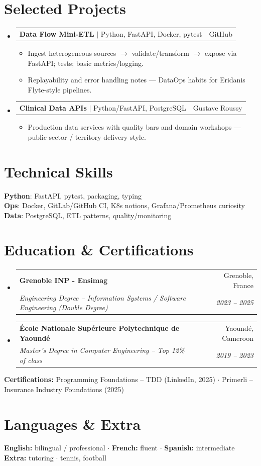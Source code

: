 \documentclass[letterpaper,10.5pt]{article}
\makeatletter
\newcommand{\resumeItem}[1]{\item\small{#1 \vspace{-1.5pt}}}
\newcommand{\resumeSubheading}[4]{\vspace{-1pt}\item\begin{tabular*}{0.97\textwidth}[t]{l@{\extracolsep{\fill}}r}\textbf{#1} & #2 \\\textit{\small#3} & \textit{\small #4} \\\end{tabular*}\vspace{-5pt}}
\newcommand{\resumeProjectHeading}[2]{\item\begin{tabular*}{0.97\textwidth}{l@{\extracolsep{\fill}}r}\small#1 & #2 \\\end{tabular*}\vspace{-5pt}}
\newcommand{\resumeSubHeadingListStart}{\begin{itemize}[leftmargin=0.15in, label={}]}
\newcommand{\resumeSubHeadingListEnd}{\end{itemize}}
\newcommand{\resumeItemListStart}{\begin{itemize}[leftmargin=0.18in]}
\newcommand{\resumeItemListEnd}{\end{itemize}\vspace{-3pt}}
\makeatother
\begin{document}
\section{Selected Projects}
\resumeSubHeadingListStart
  \resumeProjectHeading{\textbf{Data Flow Mini-ETL} $|$ Python, FastAPI, Docker, pytest}{GitHub}
    \resumeItemListStart
      \resumeItem{Ingest heterogeneous sources $\rightarrow$ validate/transform $\rightarrow$ expose via FastAPI; tests; basic metrics/logging.}
      \resumeItem{Replayability and error handling notes --- DataOps habits for Eridanis Flyte-style pipelines.}
    \resumeItemListEnd
  \resumeProjectHeading{\textbf{Clinical Data APIs} $|$ Python/FastAPI, PostgreSQL}{Gustave Roussy}
    \resumeItemListStart
      \resumeItem{Production data services with quality bars and domain workshops --- public-sector / territory delivery style.}
    \resumeItemListEnd
\resumeSubHeadingListEnd
\section{Technical Skills}
\begin{itemize}[leftmargin=0.15in, label={}]\small{\item{\textbf{Python}: FastAPI, pytest, packaging, typing \\ \textbf{Ops}: Docker, GitLab/GitHub CI, K8s notions, Grafana/Prometheus curiosity \\ \textbf{Data}: PostgreSQL, ETL patterns, quality/monitoring}}\end{itemize}
\section{Education \& Certifications}
\resumeSubHeadingListStart
  \resumeSubheading{Grenoble INP - Ensimag}{Grenoble, France}{Engineering Degree -- Information Systems / Software Engineering (Double Degree)}{2023 -- 2025}
  \resumeSubheading{\'Ecole Nationale Sup\'erieure Polytechnique de Yaound\'e}{Yaound\'e, Cameroon}{Master's Degree in Computer Engineering -- Top 12\% of class}{2019 -- 2023}
\resumeSubHeadingListEnd
\small{\textbf{Certifications:} Programming Foundations -- TDD (LinkedIn, 2025) $\cdot$ Primerli -- Insurance Industry Foundations (2025)}
\section{Languages \& Extra}
\small{\textbf{English:} bilingual / professional $\cdot$ \textbf{French:} fluent $\cdot$ \textbf{Spanish:} intermediate \\ \textbf{Extra:} tutoring $\cdot$ tennis, football}
\end{document}
